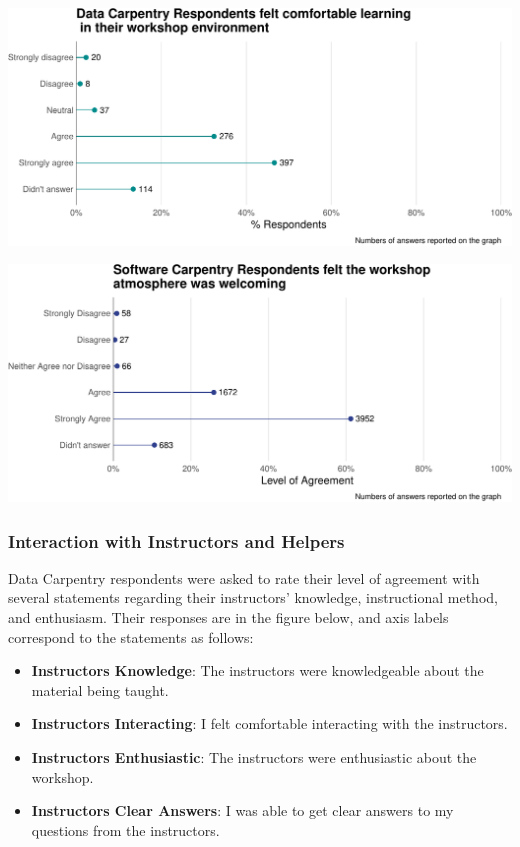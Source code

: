 \documentclass[]{article}
\makeatletter
\def\maxwidth{\ifdim\Gin@nat@width>\linewidth\linewidth\else\Gin@nat@width\fi}
\providecommand{\tightlist}{%
  \setlength{\itemsep}{0pt}\setlength{\parskip}{0pt}}
\makeatother
\begin{document}
\includegraphics[width=\maxwidth]{../figures/dc-post-workshop-comfortable-environment-1}

\includegraphics[width=\maxwidth]{../figures/swc-post-workshop-environment-1}

\subsubsection{Interaction with Instructors and
Helpers}\label{interaction-with-instructors-and-helpers}

Data Carpentry respondents were asked to rate their level of agreement
with several statements regarding their instructors' knowledge,
instructional method, and enthusiasm. Their responses are in the figure
below, and axis labels correspond to the statements as follows:

\begin{itemize}
\tightlist
\item
  \textbf{Instructors Knowledge}: The instructors were knowledgeable
  about the material being taught.
\item
  \textbf{Instructors Interacting}: I felt comfortable interacting with
  the instructors.
\item
  \textbf{Instructors Enthusiastic}: The instructors were enthusiastic
  about the workshop.
\item
  \textbf{Instructors Clear Answers}: I was able to get clear answers to
  my questions from the instructors.
\end{itemize}
\end{document}
